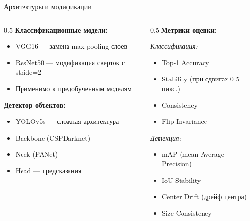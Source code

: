 \documentclass[aspectratio=169]{beamer}
\begin{document}
\begin{frame}{Архитектуры и модификации}
    \begin{columns}
        \begin{column}{0.5\textwidth}
            \textbf{Классификационные модели:}
            \begin{itemize}
                \item VGG16 — замена max-pooling слоев
                \item ResNet50 — модификация сверток с stride=2
                \item Применимо к предобученным моделям
            \end{itemize}
            
            \vspace{0.5cm}
            
            \textbf{Детектор объектов:}
            \begin{itemize}
                \item YOLOv5s — сложная архитектура
                \item Backbone (CSPDarknet)
                \item Neck (PANet)
                \item Head — предсказания
            \end{itemize}
        \end{column}
        \begin{column}{0.5\textwidth}
            \textbf{Метрики оценки:}
            
            \textit{Классификация:}
            \begin{itemize}
                \item Top-1 Accuracy
                \item Stability (при сдвигах 0-5 пикс.)
                \item Consistency
                \item Flip-Invariance
            \end{itemize}
            
            \textit{Детекция:}
            \begin{itemize}
                \item mAP (mean Average Precision)
                \item IoU Stability
                \item Center Drift (дрейф центра)
                \item Size Consistency
            \end{itemize}
        \end{column}
    \end{columns}
\end{frame}
\end{document}
